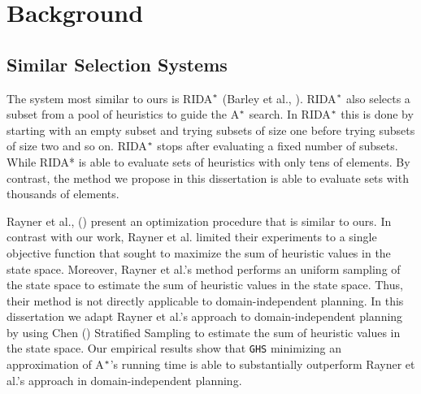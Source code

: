 
 
\chapter{Background}\label{ch:background}
\section{Similar Selection Systems}
\noindent
The system most similar to ours is RIDA$\sp{*}$ (Barley et al., \citeyear{BarleySantiagoOver}). RIDA$\sp{*}$ also selects a subset from a pool of heuristics to guide the A$\sp{*}$ search. In RIDA$\sp{*}$ this is done by starting with an empty subset and trying subsets of size one before trying subsets of size two and so on. RIDA$\sp{*}$ stops after evaluating a fixed number of subsets. While RIDA* is able to evaluate sets of heuristics with only tens of elements. By contrast, the method we propose in this dissertation is able to evaluate sets with thousands of elements.

Rayner et al., (\citeyear{raynersss13}) present an optimization procedure that is similar to ours. In contrast with our work, Rayner et al. limited their experiments to a single objective function that sought to maximize the sum of heuristic values in the state space. Moreover, Rayner et al.'s method performs an uniform sampling of the state space to estimate the sum of heuristic values in the state space. Thus, their method is not directly applicable to domain-independent planning. In this dissertation we adapt Rayner et al.'s approach to domain-independent planning by using Chen (\citeyear{chen1992heuristic}) Stratified Sampling to estimate the sum of heuristic values in the state space. Our empirical results show that \texttt{GHS} minimizing an approximation of A$\sp{*}$'s running time is able to substantially outperform Rayner et al.'s approach in domain-independent planning. 

